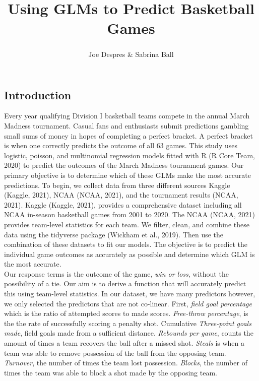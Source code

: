 \documentclass[
  man,floatsintext]{apa6}
\title{Using GLMs to Predict Basketball Games}
\author{Joe Despres\textsuperscript{} \& Sabrina Ball\textsuperscript{}}
\date{}
\affiliation{\vspace{0.5cm}\textsuperscript{} Michigan State University}
\begin{document}
\maketitle

\hypertarget{introduction}{%
\subsection{Introduction}\label{introduction}}

Every year qualifying Division I basketball teams compete in the annual March Madness tournament. Casual fans and enthusiasts submit predictions gambling small sums of money in hopes of completing a perfect bracket. A perfect bracket is when one correctly predicts the outcome of all 63 games. This study uses logistic, poisson, and multinomial regression models fitted with R (R Core Team, 2020) to predict the outcomes of the March Madness tournament games. Our primary objective is to determine which of these GLMs make the most accurate predictions. To begin, we collect data from three different sources Kaggle (Kaggle, 2021), NCAA (NCAA, 2021), and the tournament results (NCAA, 2021). Kaggle (Kaggle, 2021), provides a comprehensive dataset including all NCAA in-season basketball games from 2001 to 2020. The NCAA (NCAA, 2021) provides team-level statistics for each team. We filter, clean, and combine these data using the tidyverse package (Wickham et al., 2019). Then use the combination of these datasets to fit our models. The objective is to predict the individual game outcomes as accurately as possible and determine which GLM is the most accurate.\\
Our response terms is the outcome of the game, \emph{win or loss}, without the possibility of a tie. Our aim is to derive a function that will accurately predict this using team-level statistics. In our dataset, we have many predictors however, we only selected the predictors that are not co-linear. First, \emph{field goal percentage} which is the ratio of attempted scores to made scores. \emph{Free-throw percentage}, is the the rate of successfully scoring a penalty shot. Cumulative \emph{Three-point goals made}, field goals made from a sufficient distance. \emph{Rebounds per game}, counts the amount of times a team recovers the ball after a missed shot. \emph{Steals} is when a team was able to remove possession of the ball from the opposing team. \emph{Turnover}, the number of times the team lost possession. \emph{Blocks}, the number of times the team was able to block a shot made by the opposing team.\\
\end{document}
